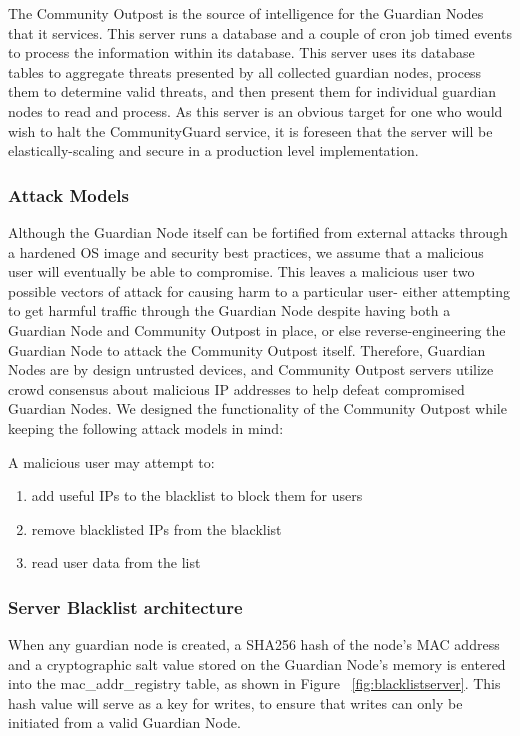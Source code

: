The Community Outpost is the source of intelligence for the Guardian Nodes that it services. This server runs a database and a couple of cron job timed events to process the information within its database. This server uses its database tables to aggregate threats presented by all collected guardian nodes, process them to determine valid threats, and then present them for individual guardian nodes to read and process. As this server is an obvious target for one who would wish to halt the CommunityGuard service, it is foreseen that the server will be elastically-scaling and secure in a production level implementation. 

\subsubsection{Attack Models}
\label{sec:design:attacks}
Although the Guardian Node itself can be fortified from external attacks through a hardened OS image and security best practices, we assume that a malicious user will eventually be able to compromise. This leaves a malicious user two possible vectors of attack for causing harm to a particular user- either attempting to get harmful traffic through the Guardian Node despite having both a Guardian Node and Community Outpost in place, or else reverse-engineering the Guardian Node to attack the Community Outpost itself. Therefore, Guardian Nodes are by design untrusted devices, and Community Outpost servers utilize crowd consensus about malicious IP addresses to help defeat compromised Guardian Nodes.
We designed the functionality of the Community Outpost while keeping the following attack models in mind:

A malicious user may attempt to:
\begin{enumerate}
\item add useful IPs to the blacklist to block them for users
\item remove blacklisted IPs from the blacklist
\item read user data from the list
\end{enumerate}

\subsubsection{Server Blacklist architecture}
\label{sec:design:blacklist}
When any guardian node is created, a SHA256 hash of the node's MAC address and a cryptographic salt value stored on the Guardian Node's memory is entered into the mac_addr_registry table, as shown in Figure ~\ref{fig:blacklistserver}. This hash value will serve as a key for writes, to ensure that writes can only be initiated from a valid Guardian Node.

